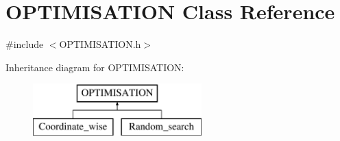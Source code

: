 \hypertarget{class_o_p_t_i_m_i_s_a_t_i_o_n}{}\section{O\+P\+T\+I\+M\+I\+S\+A\+T\+I\+ON Class Reference}
\label{class_o_p_t_i_m_i_s_a_t_i_o_n}


{\ttfamily \#include $<$O\+P\+T\+I\+M\+I\+S\+A\+T\+I\+O\+N.\+h$>$}

Inheritance diagram for O\+P\+T\+I\+M\+I\+S\+A\+T\+I\+ON\+:\begin{figure}[H]
\begin{center}
\leavevmode
\includegraphics[height=2.000000cm]{class_o_p_t_i_m_i_s_a_t_i_o_n}
\end{center}
\end{figure}
